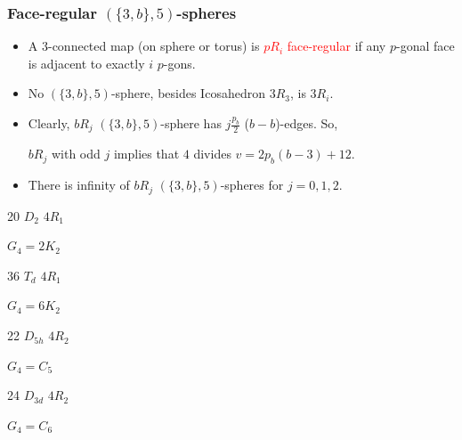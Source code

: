 \documentclass{beamer}
\begin{document}
\begin{frame}\frametitle{Face-regular $(\{3,b\},5)$-spheres}
\vspace{-1mm}

\begin{itemize}
\item A $3$-connected  
 map (on sphere or torus) is 
\textcolor{red}{$pR_i$ face-regular} if any $p$-gonal face is adjacent to 
exactly $i$ $p$-gons. 


\item No $(\{3,b\},5)$-sphere, besides Icosahedron  $3R_3$, is $3R_i$.


\item 
Clearly, 
$bR_j$ $(\{3,b\},5)$-sphere has $j\frac{p_b}{2}$  ($b-b$)-edges.
So, 

$bR_j$ with odd $j$ implies that $4$ divides $v=2p_b(b-3)+12$.

\item There is infinity of $bR_j$ $(\{3,b\},5)$-spheres for $j=0,1,2$.
\end{itemize}

\begin{center}
\begin{minipage}[b]{26mm}\centering
{}\par
20 $D_{2}$ $4R_1$\par
$G_4=2K_2$\end{minipage}
\begin{minipage}[b]{26mm}
\centering
{}\par
36 $T_{d}$ $4R_1$\par
$G_4=6K_2$
\end{minipage}
\begin{minipage}[b]{26mm}\centering
{}\par
22  $D_{5h}$ $4R_2$\par
$G_4=C_5$
\end{minipage}
\begin{minipage}[b]{26mm}\centering
{}\par
24 $D_{3d}$ $4R_2$\par
$G_4=C_6$
\end{minipage}
\end{center}
\end{frame}
\end{document}

